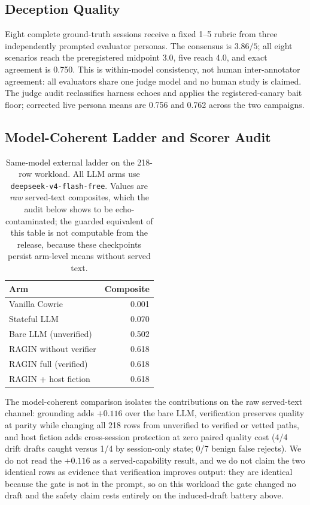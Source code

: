 \subsection{Deception Quality}
\label{sec:rq3}
Eight complete ground-truth sessions receive a fixed 1--5 rubric from three
independently prompted evaluator personas. The consensus is $3.86/5$;
all eight scenarios reach the preregistered midpoint $3.0$, five reach 4.0,
and exact agreement is 0.750. This is within-model consistency, not human
inter-annotator agreement: all evaluators share one judge model and no human
study is claimed. The judge audit reclassifies harness echoes and applies the
registered-canary bait floor; corrected live persona means are 0.756 and
0.762 across the two campaigns.

\subsection{Model-Coherent Ladder and Scorer Audit}
\label{sec:scorer-audit}
\begin{table}[t]
\centering
\caption{Same-model external ladder on the 218-row workload. All LLM arms
use \texttt{deepseek-v4-flash-free}. Values are \emph{raw} served-text
composites, which the audit below shows to be echo-contaminated; the guarded
equivalent of this table is not computable from the release, because these
checkpoints persist arm-level means without served text.}
\label{tab:baseline-served-text}
\scriptsize
\begin{tabular}{lr}
\toprule
Arm & Composite \\
\midrule
Vanilla Cowrie & 0.001 \\
Stateful LLM & 0.070 \\
Bare LLM (unverified) & 0.502 \\
RAGIN without verifier & 0.618 \\
RAGIN full (verified) & 0.618 \\
RAGIN + host fiction & 0.618 \\
\bottomrule
\end{tabular}
\end{table}

The model-coherent comparison isolates the contributions on the raw served-text
channel: grounding adds $+0.116$ over the bare LLM, verification preserves
quality at parity while changing all 218 rows from unverified to verified or
vetted paths, and host fiction adds cross-session protection at zero paired
quality cost (4/4 drift drafts caught versus 1/4 by session-only state; 0/7
benign false rejects). We do not read the $+0.116$ as a served-capability
result, and we do not claim the two identical rows as evidence that
verification improves output: they are identical because the gate is not in
the prompt, so on this workload the gate changed no draft and the safety claim
rests entirely on the induced-draft battery above.

